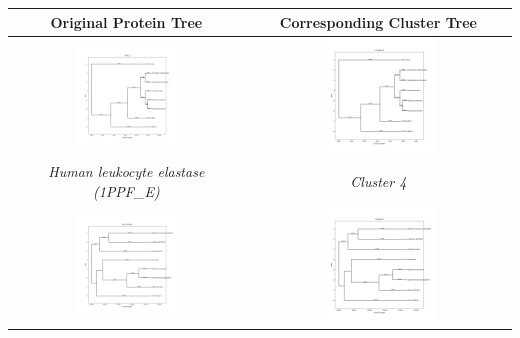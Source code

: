 \documentclass[11pt, a4paper, hidelinks]{article}
\begin{document}
\begin{longtable}{|c|c|}
        \hline
        \textbf{Original Protein Tree} & \textbf{Corresponding Cluster Tree} \\
        \hline
        \includegraphics[width=0.45\textwidth]{1PPF_E.png} &
        \includegraphics[width=0.45\textwidth]{Cluster 4.png} \\
        \hline
        \textit{Human leukocyte elastase (1PPF\_E)} & \textit{Cluster 4} \\
        \hline
        \includegraphics[width=0.45\textwidth]{NP_570139.png} &
        \includegraphics[width=0.45\textwidth]{Cluster 5.png} \\

\end{longtable}
\end{document}
